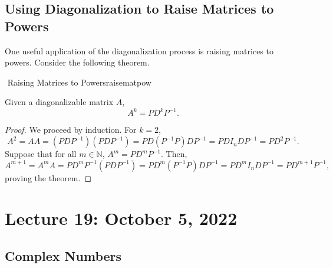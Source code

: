     \subsection{Using Diagonalization to Raise Matrices to Powers}

        One useful application of the diagonalization process is raising matrices to powers. Consider the following theorem.
        \begin{theorem}{\Stop\,\,Raising Matrices to Powers}{raisematpow}

            Given a diagonalizable matrix \(A\),
            \begin{equation*}
                A^k=PD^kP^{-1}.
            \end{equation*}
            \begin{proof}
                We proceed by induction. For \(k=2\),
                \begin{equation*}
                    A^2=AA=(PDP^{-1})(PDP^{-1})=PD(P^{-1}P)DP^{-1}=PDI_nDP^{-1}=PD^2P^{-1}.
                \end{equation*}
                Suppose that for all \(m\in\mathbb{N}\), \(A^m=PD^mP^{-1}\). Then,
                \begin{equation*}
                    A^{m+1}=A^mA=PD^mP^{-1}(PDP^{-1})=PD^m(P^{-1}P)DP^{-1}=PD^mI_nDP^{-1}=PD^{m+1}P^{-1},
                \end{equation*}
                proving the theorem.
            \end{proof}
            
        \end{theorem} 

\pagebreak

\section{Lecture 19: October 5, 2022}

    \subsection{Complex Numbers}

